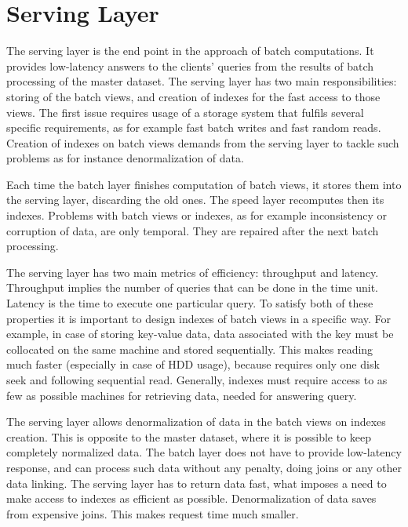 \section{Serving Layer}

The serving layer is the end point in the approach of batch computations.
It provides low-latency answers to the clients' queries from the results of batch processing of the master dataset.
The serving layer has two main responsibilities: storing of the batch views, and creation of indexes for the fast access to those views.
The first issue requires usage of a storage system that fulfils several specific requirements, as for example fast batch writes and fast random reads. 
Creation of indexes on batch views demands from the serving layer to tackle such problems as for instance denormalization of data.

Each time the batch layer finishes computation of batch views, it stores them into the serving layer, discarding the old ones.
The speed layer recomputes then its indexes.
Problems with batch views or indexes, as for example inconsistency or corruption of data, are only temporal.
They are repaired after the next batch processing.

The serving layer has two main metrics of efficiency: throughput and latency.
Throughput implies the number of queries that can be done in the time unit.
Latency is the time to execute one particular query.
To satisfy both of these properties it is important to design indexes of batch views in a specific way.
For example, in case of storing key-value data, data associated with the key must be collocated on the same machine and stored sequentially.
This makes reading much faster (especially in case of HDD usage), because requires only one disk seek and following sequential read.
Generally, indexes must require access to as few as possible machines for retrieving data, needed for answering query.

The serving layer allows denormalization of data in the batch views on indexes creation.
This is opposite to the master dataset, where it is possible to keep completely normalized data.
The batch layer does not have to provide low-latency response, and can process such data without any penalty, doing joins or any other data linking.
The serving layer has to return data fast, what imposes a need to make access to indexes as efficient as possible.
Denormalization of data saves from expensive joins.
This makes request time much smaller.

